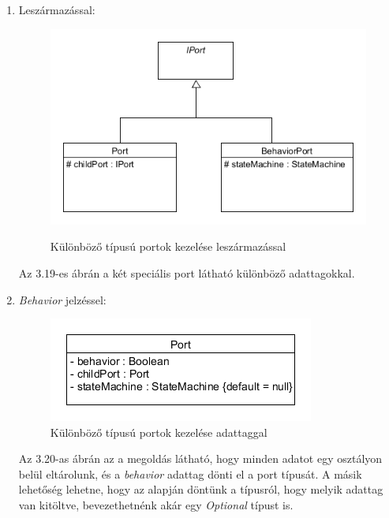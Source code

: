 \documentclass[a4paper,12pt]{report}
\begin{document}
\begin{enumerate}
\item Leszármazással: \\

\begin{figure}[H]
\begin{center}
\includegraphics[scale=0.7]{behav_generalport_diag.png} \\
\end{center}
\caption{Különböző típusú portok kezelése leszármazással}
\end{figure}

Az 3.19-es ábrán a két speciális port látható különböző adattagokkal.

\item \textit{Behavior} jelzéssel: \\

\begin{figure}[H]
\begin{center}
\includegraphics[scale=0.7]{simple_port_diag.png}
\end{center}
\caption{Különböző típusú portok kezelése adattaggal}
\end{figure}

Az 3.20-as ábrán az a megoldás látható, hogy minden adatot egy osztályon belül eltárolunk, és a \textit{behavior} adattag dönti el a port típusát. A másik lehetőség lehetne, hogy az alapján döntünk a típusról, hogy melyik adattag van kitöltve, bevezethetnénk akár egy \textit{Optional} típust is. 


\end{enumerate}
\end{document}

